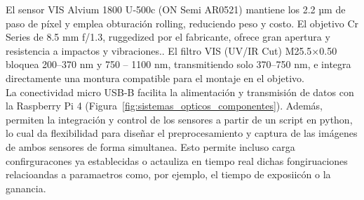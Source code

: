     \noindent El sensor VIS Alvium 1800 U‑500c (ON Semi AR0521) mantiene los 2.2 µm de paso de píxel y emplea obturación rolling, reduciendo peso y costo. El objetivo Cr Series de 8.5 mm f/1.3, ruggedized por el fabricante, ofrece gran apertura y resistencia a impactos y vibraciones.. El filtro VIS (UV/IR Cut) M25.5×0.50 bloquea 200–370 nm y 750 – 1100 nm, transmitiendo solo 370–750 nm, e integra directamente una montura compatible para el montaje en el objetivo.\\
    
    \noindent La conectividad micro USB‑B facilita la alimentación y transmisión de datos con la Raspberry Pi 4 (Figura~\ref{fig:sistemas_opticos_componentes}). Además, permiten la integración y control de los sensores a partir de un script en python, lo cual da flexibilidad para diseñar el preprocesamiento y captura de las imágenes de ambos sensores de forma simultanea. Esto permite incluso carga confirguracones ya establecidas o actauliza en tiempo real dichas fongiruaciones relacioandas a paramaetros como, por ejemplo, el tiempo de exposiicón o la ganancia.
    
        
    
    
    
    


